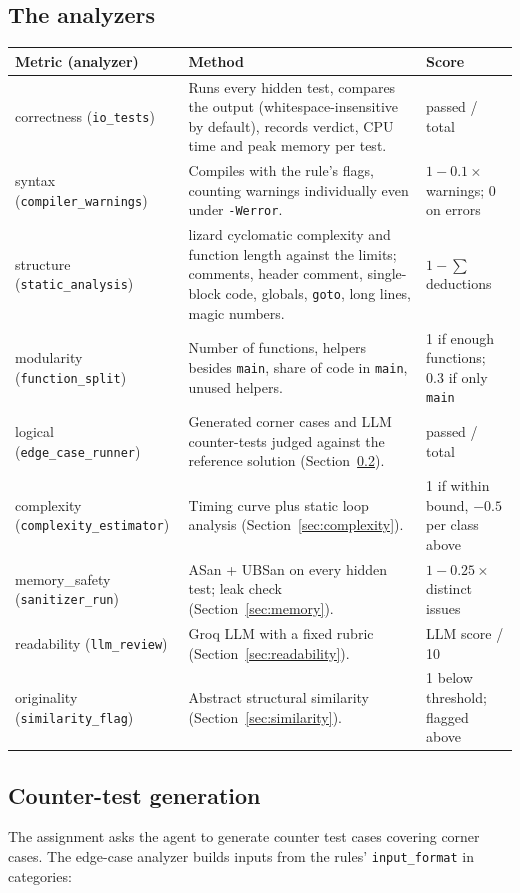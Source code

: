 \documentclass[11pt,a4paper]{article}
\newcommand{\file}[1]{\nolinkurl{#1}}
\begin{document}
\subsection{The analyzers}\label{sec:analyzers}
\begin{longtable}{@{}P{3.3cm}P{7.6cm}P{3.9cm}@{}}
\toprule
\textbf{Metric (analyzer)} & \textbf{Method} & \textbf{Score} \\
\midrule
\endhead
correctness (\file{io_tests}) & Runs every hidden test, compares the output (whitespace-insensitive by default), records verdict, CPU time and peak memory per test. & passed / total \\
syntax (\file{compiler_warnings}) & Compiles with the rule's flags, counting warnings individually even under \texttt{-Werror}. & $1-0.1\times$warnings; 0 on errors \\
structure (\file{static_analysis}) & lizard cyclomatic complexity and function length against the limits; comments, header comment, single-block code, globals, \texttt{goto}, long lines, magic numbers. & $1-\sum$ deductions \\
modularity (\file{function_split}) & Number of functions, helpers besides \texttt{main}, share of code in \texttt{main}, unused helpers. & 1 if enough functions; 0.3 if only \texttt{main} \\
logical (\file{edge_case_runner}) & Generated corner cases and LLM counter-tests judged against the reference solution (Section~\ref{sec:counter}). & passed / total \\
complexity (\file{complexity_estimator}) & Timing curve plus static loop analysis (Section~\ref{sec:complexity}). & 1 if within bound, $-0.5$ per class above \\
memory\_safety (\file{sanitizer_run}) & ASan + UBSan on every hidden test; leak check (Section~\ref{sec:memory}). & $1-0.25\times$distinct issues \\
readability (\file{llm_review}) & Groq LLM with a fixed rubric (Section~\ref{sec:readability}). & LLM score / 10 \\
originality (\file{similarity_flag}) & Abstract structural similarity (Section~\ref{sec:similarity}). & 1 below threshold; flagged above \\
\bottomrule
\end{longtable}

\subsection{Counter-test generation}\label{sec:counter}
The assignment asks the agent to generate counter test cases covering corner cases. The edge-case analyzer builds
inputs from the rules' \texttt{input\_format} in categories:
\end{document}

